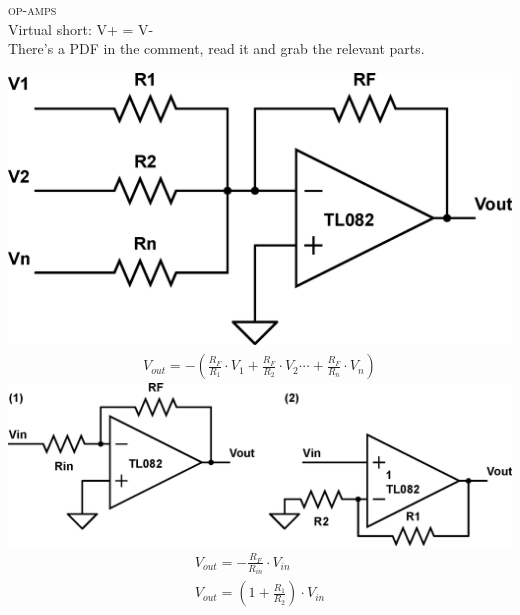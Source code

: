 \documentclass[10pt,letterpaper,english]{article}
\begin{document}
\textsc{op-amps}\\
Virtual short: V+ = V-\\
There's a PDF in the comment, read it and grab the relevant parts.

\begin{multicols}{2}
\includegraphics[scale=0.2]{opamp-1.eps}
\begin{align*}
V_{out} = -\left(\frac{R_F}{R_1}\cdot V_1 + \frac{R_F}{R_2}\cdot V_2 \cdots + \frac{R_F}{R_n}\cdot V_n\right)
\end{align*}
\includegraphics[scale=0.4]{opamp-2.eps}
\begin{align*}
V_{out} = -\frac{R_F}{R_{in}}\cdot V_{in} \tag*{(1) Inverting}\\
V_{out} = \left(1 + \frac{R_1}{R_2}\right)\cdot V_{in} \tag*{(2) Non-inverting}\\
\end{align*}
\end{multicols}
\end{document}

